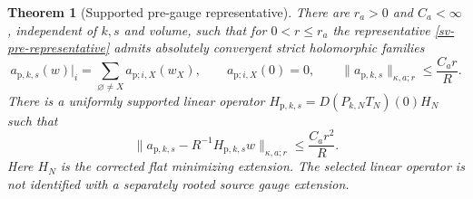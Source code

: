 \documentclass[11pt]{article}
\newtheorem{theorem}{Theorem}
\theoremstyle{remark}\newtheorem{remark}[theorem]{Remark}
\begin{document}
\begin{theorem}[Supported pre-gauge representative]
\label{sv-support-theorem}
There are $r_a>0$ and $C_a<\infty$, independent of $k,s$ and volume,
such that for $0<r\le r_a$ the representative
\eqref{sv-pre-representative} admits absolutely convergent strict
holomorphic families
\begin{equation}
 a_{\mathrm p,k,s}(w)|_i
   =\sum_{\varnothing\ne X}a_{\mathrm p;i,X}(w_X),\qquad
 a_{\mathrm p;i,X}(0)=0,\qquad
 \|a_{\mathrm p,k,s}\|_{\kappa,a;r}\le \frac{C_ar}{R}.
 \label{sv-supported-amplitude}
\end{equation}
There is a uniformly supported linear operator
$H_{\mathrm p,k,s}=D(P_{k,N}T_N)(0)H_N$ such that
\begin{equation}
 \|a_{\mathrm p,k,s}-R^{-1}H_{\mathrm p,k,s}w\|_{\kappa,a;r}
       \le \frac{C_ar^2}{R}.
 \label{sv-supported-remainder}
\end{equation}
Here $H_N$ is the corrected flat minimizing extension. The selected
linear operator is not identified with a separately rooted source
gauge extension.
\end{theorem}
\end{document}
